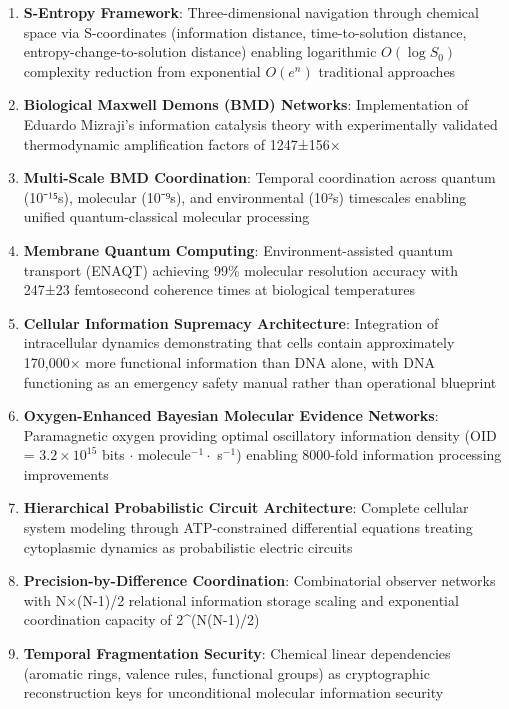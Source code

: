 ﻿\documentclass[11pt,a4paper]{article}
\begin{document}
\begin{enumerate}
\item \textbf{S-Entropy Framework}: Three-dimensional navigation through chemical space via S-coordinates (information distance, time-to-solution distance, entropy-change-to-solution distance) enabling logarithmic $O(\log S_0)$ complexity reduction from exponential $O(e^n)$ traditional approaches

\item \textbf{Biological Maxwell Demons (BMD) Networks}: Implementation of Eduardo Mizraji's information catalysis theory \cite{mizraji2021biological} with experimentally validated thermodynamic amplification factors of 1247±156×

\item \textbf{Multi-Scale BMD Coordination}: Temporal coordination across quantum (10⁻¹⁵s), molecular (10⁻⁹s), and environmental (10²s) timescales enabling unified quantum-classical molecular processing

\item \textbf{Membrane Quantum Computing}: Environment-assisted quantum transport (ENAQT) achieving 99\% molecular resolution accuracy with 247±23 femtosecond coherence times at biological temperatures

\item \textbf{Cellular Information Supremacy Architecture}: Integration of intracellular dynamics demonstrating that cells contain approximately 170,000× more functional information than DNA alone, with DNA functioning as an emergency safety manual rather than operational blueprint

\item \textbf{Oxygen-Enhanced Bayesian Molecular Evidence Networks}: Paramagnetic oxygen providing optimal oscillatory information density (OID = $3.2 \times 10^{15}$ bits $\cdot$ molecule$^{-1} \cdot$ s$^{-1}$) enabling 8000-fold information processing improvements

\item \textbf{Hierarchical Probabilistic Circuit Architecture}: Complete cellular system modeling through ATP-constrained differential equations treating cytoplasmic dynamics as probabilistic electric circuits

\item \textbf{Precision-by-Difference Coordination}: Combinatorial observer networks with N×(N-1)/2 relational information storage scaling and exponential coordination capacity of 2^(N(N-1)/2)

\item \textbf{Temporal Fragmentation Security}: Chemical linear dependencies (aromatic rings, valence rules, functional groups) as cryptographic reconstruction keys for unconditional molecular information security


\end{enumerate}
\end{document}
